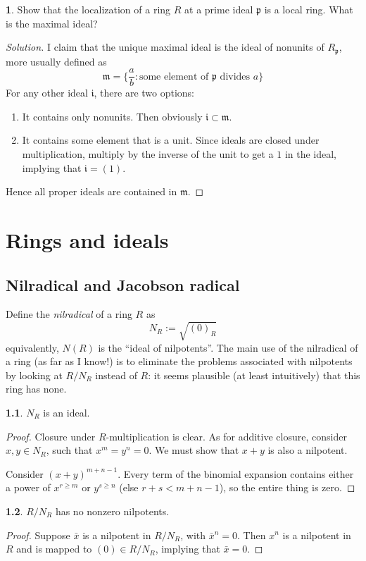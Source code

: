 \documentclass{book}
\newcommand{\fr}[1]{\mathfrak #1}
\theoremstyle{definition}
\theoremstyle{block}
\newtheorem{block}{}[section]
\newtheorem{block*}[block]{}
\theoremstyle{thm}
\begin{document}
\begin{block*}
  Show that the localization of a ring $R$ at a prime ideal $\fr p$ is a local
  ring. What is the maximal ideal?
\end{block*}
\begin{proof}[Solution]
  I claim that the unique maximal ideal is the ideal of nonunits of $R_{\fr p}$,
  more usually defined as
  \[
    \fr m = \{\frac a b : \text{some element of } \fr p \text { divides } a\}
  \]
  For any other ideal $\fr i$, there are two options:
  \begin{enumerate}[label=(\alph*)]
    \item It contains only nonunits. Then obviously $\fr i \subset \fr m$.
    \item It contains some element that is a unit. Since ideals are closed under
      multiplication, multiply by the inverse of the unit to get a $1$ in the
      ideal, implying that $\fr i = (1)$.
  \end{enumerate}
  Hence all proper ideals are contained in $\fr m$.
\end{proof}

\chapter{Rings and ideals}

\section{Nilradical and Jacobson radical}
Define the \textit{nilradical} of a ring $R$ as \[N_R:=\sqrt{(0)_R}\]
equivalently, $N(R)$ is the ``ideal of nilpotents''. The main use of the
nilradical of a ring (as far as I know!) is to eliminate the problems associated
with nilpotents by looking at $R/N_R$ instead of $R$: it seems plausible (at
least intuitively) that this ring has none.

\begin{block}
  $N_R$ is an ideal.
\end{block}
\begin{proof}
  Closure under $R$-multiplication is clear. As for additive closure, consider
  $x,y\in N_R$, such that $x^m = y^n = 0$. We must show that $x+y$ is also a
  nilpotent.\par
  Consider $(x+y)^{m+n-1}$. Every term of the binomial expansion contains either
  a power of $x^{r\geq m}$ or $y^{s\geq n}$ (else $r+s<m+n-1$), so the entire thing is zero.
\end{proof}

\begin{block}
  $R/N_R$ has no nonzero nilpotents.
\end{block}
\begin{proof}
  Suppose $\bar x$ is a nilpotent in $R/N_R$, with ${\bar x}^n=0$. Then $x^n$ is
  a nilpotent in $R$ and is mapped to $(0)\in R/N_R$, implying that $\bar x = 0$. 
\end{proof}
\end{document}
